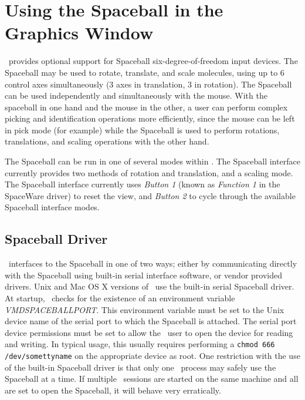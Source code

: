 %
%
%

\section{Using the Spaceball in the Graphics Window}
\label{ug:spaceball}

\VMD\ provides optional support for Spaceball six-degree-of-freedom input
devices.  The Spaceball may be used to rotate, translate, and scale molecules,
using up to 6 control axes simultaneously (3 axes in translation, 
3 in rotation).  The Spaceball can be used independently and
simultaneously with the mouse.  With the spaceball in one hand and the 
mouse in the other, a user can perform complex picking and identification
operations more efficiently, since the mouse can be left in pick mode
(for example) while the Spaceball is used to perform rotations, 
translations, and scaling operations with the other hand. 

The Spaceball can be run in one of several modes within \VMD. 
The Spaceball interface currently provides two methods of rotation 
and translation, and a scaling mode.  The Spaceball interface
currently uses {\em Button 1} (known as {\em Function 1} in the SpaceWare
driver) to reset the view, and {\em Button 2} to cycle through the
available Spaceball interface modes.

\subsection{Spaceball Driver}
\VMD\ interfaces to the Spaceball in one of two 
ways; either by communicating directly with the Spaceball using 
built-in serial interface software, or vendor provided drivers.
Unix and Mac OS X versions of \VMD\ use the built-in serial Spaceball driver.
At startup, \VMD\ checks for the existence of an environment
variable {\em VMDSPACEBALLPORT}.  This environment variable must be
set to the Unix device name of the serial port to which the Spaceball
is attached.  The serial port device permissions must be set to allow
the \VMD\ user to open the device for reading and writing.  In typical
usage, this usually requires performing a {\tt chmod 666 /dev/somettyname} 
on the appropriate device as root.
One restriction with the use of the built-in Spaceball driver is that
only one \VMD\ process may safely use the Spaceball at a time.  If multiple
\VMD\ sessions are started on the same machine and all are set to open
the Spaceball, it will behave very erratically.

